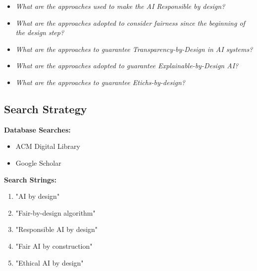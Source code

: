 \documentclass{article}
\begin{document}
\begin{itemize}

    \item \emph{What are the approaches used to make the AI Responsible by design?}

    \item \emph{What are the approaches adopted to consider fairness since the beginning
    of the design step?}

    \item \emph{What are the approaches to guarantee Transparency-by-Design in AI
    systems?}

    \item \emph{What are the approaches adopted to guarantee Explainable-by-Design
    AI?}

    \item \emph{What are the approaches to guarantee Etichs-by-design?}


\end{itemize}

\subsection{Search Strategy}

    \textbf{Database Searches:}

\begin{itemize}

    \item ACM Digital Library

    \item Google Scholar

\end{itemize}

\textbf{Search Strings:}

\begin{enumerate}

    \item "AI by design"

    \item "Fair-by-design algorithm"

    \item "Responsible AI by design"

    \item "Fair AI by construction"

    \item "Ethical AI by design"

\end{enumerate}
\end{document}
